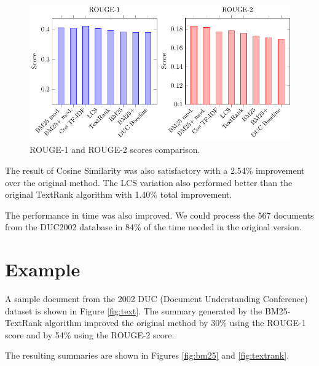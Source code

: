 \documentclass{llncs}
\begin{document}
\begin{figure}[h!]
    \centering
    \includegraphics[width=1\textwidth]{rouge-scores-en.pdf}
    \caption{ROUGE-1 and ROUGE-2 scores comparison.}
\end{figure}

The result of Cosine Similarity was also satisfactory with a 2.54\% improvement over the original method. The LCS variation also performed better than the original TextRank algorithm with 1.40\% total improvement.

The performance in time was also improved. We could process the 567 documents from the DUC2002 database in 84\% of the time needed in the original version.


\section{Example}
A sample document from the 2002 DUC (Document Understanding Conference) dataset \cite{duc2002-guidelines} is shown in Figure \ref{fig:text}. The summary generated by the BM25-TextRank algorithm improved the original method by 30\% using the ROUGE-1 score and by 54\% using the ROUGE-2 score.

The resulting summaries are shown in Figures \ref{fig:bm25} and \ref{fig:textrank}.
\end{document}
